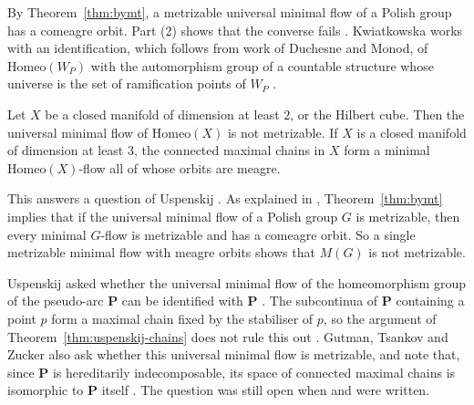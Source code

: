 \begin{remark}\label{rem:wazewski}
By Theorem~\ref{thm:bymt}, a metrizable universal minimal flow of a Polish
group has a comeagre orbit. Part (2) shows that the converse fails
\cite{GutmanTsankovZucker2021}. Kwiatkowska works with an identification,
which follows from work of Duchesne and Monod, of $\mathrm{Homeo}(W_P)$ with
the automorphism group of a countable structure whose universe is the set of
ramification points of $W_P$ \cite{Kwiatkowska2018}.
\end{remark}

\begin{theorem}\label{thm:gtz}
Let $X$ be a closed manifold of dimension at least $2$, or the Hilbert cube.
Then the universal minimal flow of $\mathrm{Homeo}(X)$ is not metrizable. If
$X$ is a closed manifold of dimension at least $3$, the connected maximal
chains in $X$ form a minimal $\mathrm{Homeo}(X)$-flow all of whose orbits are
meagre.
\end{theorem}

\begin{remark}\label{rem:gtz}
This answers a question of Uspenskij \cite[Question~1.2]{Uspenskij2000}. As
explained in
\cite{GutmanTsankovZucker2021}, Theorem~\ref{thm:bymt} implies that if the
universal minimal flow of a Polish group $G$ is metrizable, then every minimal
$G$-flow is metrizable and has a comeagre orbit. So a single metrizable minimal
flow with meagre orbits shows that $M(G)$ is not metrizable.
\end{remark}

\begin{remark}\label{rem:pseudo-arc}
Uspenskij asked whether the universal minimal flow of the homeomorphism group
of the pseudo-arc $\mathbf{P}$ can be identified with $\mathbf{P}$
\cite[Question~1.3]{Uspenskij2000}. The subcontinua of $\mathbf{P}$ containing
a point $p$ form a maximal chain fixed by the stabiliser of $p$, so the
argument of Theorem~\ref{thm:uspenskij-chains} does not rule this out
\cite[Remark~2.4]{Uspenskij2000}. Gutman, Tsankov and Zucker also ask whether
this universal minimal flow is metrizable, and note that, since $\mathbf{P}$
is hereditarily indecomposable, its space of connected maximal chains is
isomorphic to $\mathbf{P}$ itself \cite{GutmanTsankovZucker2021}. The
question was still open when \cite{BartosovaKwiatkowska2019} and
\cite{GutmanTsankovZucker2021} were written.
\end{remark}
